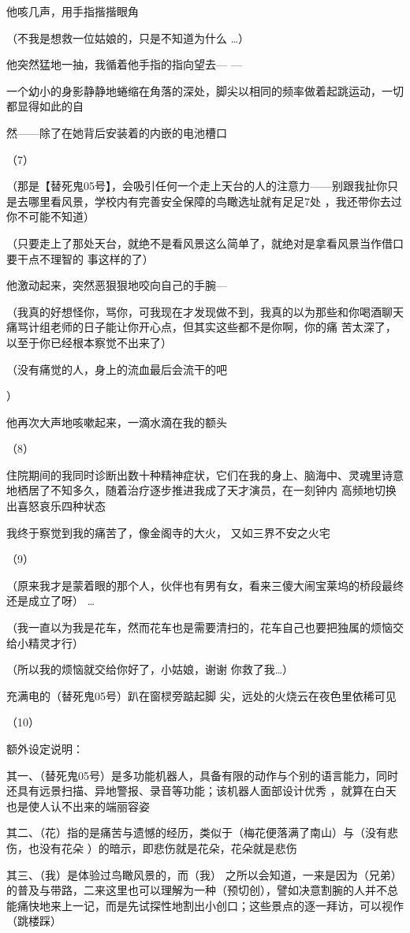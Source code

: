 \documentclass{article}
\begin{document}
他咳几声，用手指揩揩眼角 

（不我是想救一位姑娘的，只是不知道为什么
…） 

他突然猛地一抽，我循着他手指的指向望去—
— 

一个幼小的身影静静地蜷缩在角落的深处，脚尖以相同的频率做着起跳运动，一切都显得如此的自

\newpage
然——除了在她背后安装着的内嵌的电池槽口 


（7） 

（那是【替死鬼05号】，会吸引任何一个走上天台的人的注意力——别跟我扯你只是去哪里看风景，学校内有完善安全保障的鸟瞰选址就有足足7处
，我还带你去过你不可能不知道） 

（只要走上了那处天台，就绝不是看风景这么简单了，就绝对是拿看风景当作借口要干点不理智的
事这样的了） 

他激动起来，突然恶狠狠地咬向自己的手腕—

（我真的好想怪你，骂你，可我现在才发现做不到，我真的以为那些和你喝酒聊天痛骂计组老师的日子能让你开心点，但其实这些都不是你啊，你的痛
苦太深了，以至于你已经根本察觉不出来了） 

（没有痛觉的人，身上的流血最后会流干的吧

\newpage
） 

他再次大声地咳嗽起来，一滴水滴在我的额头


（8） 

住院期间的我同时诊断出数十种精神症状，它们在我的身上、脑海中、灵魂里诗意地栖居了不知多久，随着治疗逐步推进我成了天才演员，在一刻钟内
高频地切换出喜怒哀乐四种状态 

我终于察觉到我的痛苦了，像金阁寺的大火，
又如三界不安之火宅 


（9） 

（原来我才是蒙着眼的那个人，伙伴也有男有女，看来三傻大闹宝莱坞的桥段最终还是成立了呀）
… 

（我一直以为我是花车，然而花车也是需要清扫的，花车自己也要把独属的烦恼交给小精灵才行）
\newpage


（所以我的烦恼就交给你好了，小姑娘，谢谢
你救了我…） 

充满电的（替死鬼05号）趴在窗棂旁踮起脚
尖，远处的火烧云在夜色里依稀可见 


（10） 


额外设定说明： 

其一、（替死鬼05号）是多功能机器人，具备有限的动作与个别的语言能力，同时还具有远景扫描、异地警报、录音等功能；该机器人面部设计优秀
，就算在白天也是使人认不出来的端丽容姿 

其二、（花）指的是痛苦与遗憾的经历，类似于（梅花便落满了南山）与（没有悲伤，也没有花朵
）的暗示，即悲伤就是花朵，花朵就是悲伤 

其三、（我）是体验过鸟瞰风景的，而（我）
\newpage
之所以会知道，一来是因为（兄弟）的普及与带路，二来这里也可以理解为一种（预切创），譬如决意割腕的人并不总能痛快地来上一记，而是先试探性地割出小创口；这些景点的逐一拜访，可以视作（跳楼踩）
\end{document}
